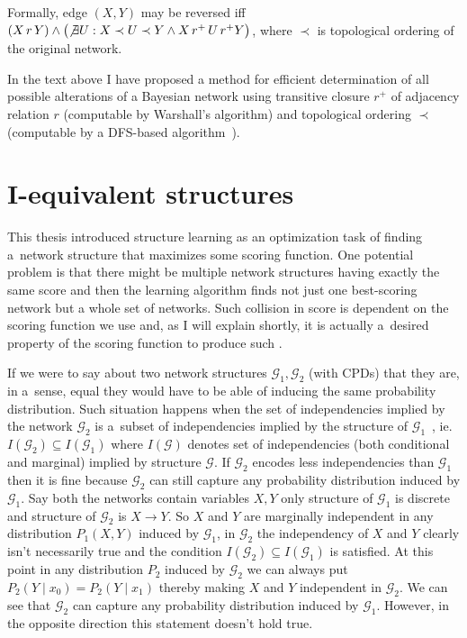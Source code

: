 \documentclass[english,cover]{fitthesis} %
\begin{document}
Formally, edge $(X,Y)$ may be reversed iff $(X \, r \, Y) \land \bigl(\not \exists U: X \prec U \prec Y \land X \, r^+ \, U \, r^+Y \bigr)$, where $\prec$ is topological ordering of the original network.

\medskip
In the text above I have proposed a method for efficient determination of all possible alterations of a Bayesian network using transitive closure $r^+$ of adjacency relation $r$ (computable by Warshall's algorithm) and topological ordering $\prec$ (computable by a DFS-based algorithm~\cite{cormen_introduction_to_algorithms}).






\section{I-equivalent structures}
This thesis introduced structure learning as an optimization task of finding a~network structure that maximizes some scoring function. One potential problem is that there might be multiple network structures having exactly the same score and then the learning algorithm finds not just one best-scoring network but a whole set of networks. Such collision in score is dependent on the scoring function we use and, as I will explain shortly, it is actually a~desired property of the scoring function to produce such .

If we were to say about two network structures $\mathcal{G}_1, \mathcal{G}_2$ (with CPDs) that they are, in a~sense, equal they would have to be able of inducing the same probability distribution. Such situation happens when the set of independencies implied by the network $\mathcal{G}_2$ is a~subset of independencies implied by the structure of $\mathcal{G}_1$~\cite[p.~76]{pgm}, ie. $I(\mathcal{G}_2) \subseteq I(\mathcal{G}_1)$ where $I(\mathcal{G})$ denotes set of independencies (both conditional and marginal) implied by structure $\mathcal{G}$. If $\mathcal{G}_2$ encodes less independencies than $\mathcal{G}_1$ then it is fine because $\mathcal{G}_2$ can still capture any probability distribution induced by $\mathcal{G}_1$. Say both the networks contain variables $X,Y$ only structure of $\mathcal{G}_1$ is discrete and structure of $\mathcal{G}_2$ is $X \rightarrow Y$. So $X$ and $Y$ are marginally independent in any distribution $P_1(X,Y)$ induced by $\mathcal{G}_1$, in $\mathcal{G}_2$ the independency of $X$ and $Y$ clearly isn't necessarily true and the condition $I(\mathcal{G}_2) \subseteq I(\mathcal{G}_1)$ is satisfied. At this point in any distribution $P_2$ induced by $\mathcal{G}_2$ we can always put $P_2(Y \mid x_0) = P_2(Y \mid x_1)$ thereby making $X$ and $Y$ independent in $\mathcal{G}_2$. We can see that $\mathcal{G}_2$ can capture any probability distribution induced by $\mathcal{G}_1$. However, in the opposite direction this statement doesn't hold true.
\end{document}

